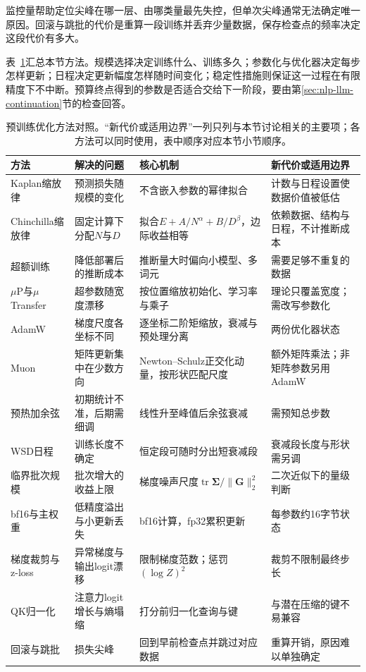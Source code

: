 监控量帮助定位尖峰在哪一层、由哪类量最先失控，但单次尖峰通常无法确定唯一原因。回滚与跳批的代价是重算一段训练并丢弃少量数据，保存检查点的频率决定这段代价有多大。

表~\ref{tab:nlp-llm-optimization-methods}汇总本节方法。规模选择决定训练什么、训练多久；参数化与优化器决定每步怎样更新；日程决定更新幅度怎样随时间变化；稳定性措施则保证这一过程在有限精度下不中断。预算终点得到的参数是否适合交给下一阶段，要由第\ref{sec:nlp-llm-continuation}节的检查回答。

\begin{table}[htbp]
 \small
 \begin{tabularx}{\linewidth}{@{}p{28mm}p{38mm}p{44mm}X@{}}
  \toprule
  方法 & 解决的问题 & 核心机制 & 新代价或适用边界\\
  \midrule
  Kaplan缩放律 & 预测损失随规模的变化 & 不含嵌入参数的幂律拟合 & 计数与日程设置使数据价值被低估\\
  Chinchilla缩放律 & 固定计算下分配$N$与$D$ & 拟合$E+A/N^\alpha+B/D^\beta$，边际收益相等 & 依赖数据、结构与日程，不计推断成本\\
  超额训练 & 降低部署后的推断成本 & 推断量大时偏向小模型、多词元 & 需要足够不重复的数据\\
  $\mu$P与$\mu$Transfer & 超参数随宽度漂移 & 按位置缩放初始化、学习率与乘子 & 理论只覆盖宽度；需改写参数化\\
  AdamW & 梯度尺度各坐标不同 & 逐坐标二阶矩缩放，衰减与预处理分离 & 两份优化器状态\\
  Muon & 矩阵更新集中在少数方向 & Newton--Schulz正交化动量，按形状匹配尺度 & 额外矩阵乘法；非矩阵参数另用AdamW\\
  预热加余弦 & 初期统计不准，后期需细调 & 线性升至峰值后余弦衰减 & 需预知总步数\\
  WSD日程 & 训练长度不确定 & 恒定段可随时分出短衰减段 & 衰减段长度与形状需另调\\
  临界批次规模 & 批次增大的收益上限 & 梯度噪声尺度$\operatorname{tr}\bm\Sigma/\lVert\bm G\rVert_2^2$ & 二次近似下的量级判断\\
  bf16与主权重 & 低精度溢出与小更新丢失 & bf16计算，fp32累积更新 & 每参数约16字节状态\\
  梯度裁剪与z-loss & 异常梯度与输出logit漂移 & 限制梯度范数；惩罚$(\log Z)^2$ & 裁剪不限制最终步长\\
  QK归一化 & 注意力logit增长与熵塌缩 & 打分前归一化查询与键 & 与潜在压缩的键不易兼容\\
  回滚与跳批 & 损失尖峰 & 回到早前检查点并跳过对应数据 & 重算开销，原因难以单独确定\\
  \bottomrule
 \end{tabularx}
 \caption{预训练优化方法对照。“新代价或适用边界”一列只列与本节讨论相关的主要项；各方法可以同时使用，表中顺序对应本节小节顺序。}
 \label{tab:nlp-llm-optimization-methods}
\end{table}
